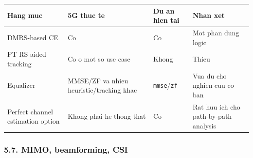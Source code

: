 \documentclass[
  vietnamese,
  a4paper,
  11pt]{article}
\newcounter{none} %
\begin{document}
{\def\LTcaptype{none} %
\begin{longtable}[]{@{}
  >{\raggedright\arraybackslash}p{}
  >{\raggedright\arraybackslash}p{}
  >{\raggedright\arraybackslash}p{}
  >{\raggedright\arraybackslash}p{}@{}}
\toprule\noalign{}
\begin{minipage}[b]{\linewidth}\raggedright
Hang muc
\end{minipage} & \begin{minipage}[b]{\linewidth}\raggedright
5G thuc te
\end{minipage} & \begin{minipage}[b]{\linewidth}\raggedright
Du an hien tai
\end{minipage} & \begin{minipage}[b]{\linewidth}\raggedright
Nhan xet
\end{minipage} \\
\midrule\noalign{}
\endhead
\bottomrule\noalign{}
\endlastfoot
DMRS-based CE & Co & Co & Mot phan dung logic \\
PT-RS aided tracking & Co o mot so use case & Khong & Thieu \\
Equalizer & MMSE/ZF va nhieu heuristic/tracking khac &
\texttt{mmse}/\texttt{zf} & Vua du cho nghien cuu co ban \\
Perfect channel estimation option & Khong phai he thong that & Co & Rat
huu ich cho path-by-path analysis \\
\end{longtable}
}

\subsubsection{5.7. MIMO, beamforming, CSI}\label{mimo-beamforming-csi}
\end{document}
